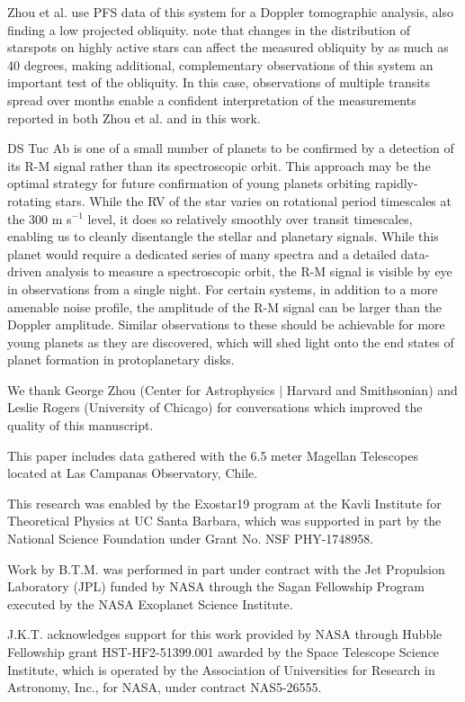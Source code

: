 \documentclass[twocolumn]{aastex63}
\begin{document}
Zhou et al. use PFS data of this system for a Doppler tomographic analysis, also finding a low projected obliquity. \citet{Oshagh12} note that changes in the distribution of starspots on highly active stars can affect the measured obliquity by as much as 40 degrees, making additional, complementary observations of this system an important test of the obliquity. 
In this case, observations of multiple transits spread over months enable a confident interpretation of the measurements reported in both Zhou et al. and in this work.

DS Tuc Ab is one of a small number of planets to be confirmed by a detection of its R-M signal rather than its spectroscopic orbit. 
This approach may be the optimal strategy for future confirmation of young planets orbiting rapidly-rotating stars. 
While the RV of the star varies on rotational period timescales at the 300 m s$^{-1}$ level, it does so relatively smoothly over transit timescales, enabling us to cleanly disentangle the stellar and planetary signals.
While this planet would require a dedicated series of many spectra and a detailed data-driven analysis to measure a spectroscopic orbit, the R-M signal is visible by eye in observations from a single night.
For certain systems, in addition to a more amenable noise profile, the amplitude of the R-M signal can be larger than the Doppler amplitude. 
Similar observations to these should be achievable for more young planets as they are discovered, which will shed light onto the end states of planet formation in protoplanetary disks.


\acknowledgements

We thank George Zhou (Center for Astrophysics $|$ Harvard and Smithsonian) and Leslie Rogers (University of Chicago) for conversations which improved the quality of this manuscript.

This paper includes data gathered with the 6.5 meter Magellan Telescopes located at Las Campanas Observatory, Chile.


This research was enabled by the Exostar19 program at the Kavli Institute for Theoretical Physics at UC Santa Barbara, which was supported in part by the National Science Foundation under Grant No. NSF PHY-1748958.


Work by B.T.M. was performed in part under contract with the Jet
Propulsion Laboratory (JPL) funded by NASA through
the Sagan Fellowship Program executed by the NASA
Exoplanet Science Institute.

J.K.T. acknowledges support for this work provided by NASA through Hubble Fellowship grant HST-HF2-51399.001 awarded by the Space Telescope Science Institute, which is operated by the Association of Universities for Research in Astronomy, Inc., for NASA, under contract NAS5-26555.
\end{document}
